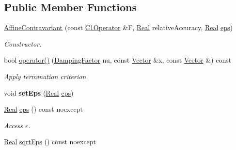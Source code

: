 \subsection*{\-Public \-Member \-Functions}
\begin{DoxyCompactItemize}
\item 
\hypertarget{classSpacy_1_1Newton_1_1Termination_1_1AffineContravariant_a84217ee3e52e0bc40ad2e1ecc13abf9a}{\hyperlink{classSpacy_1_1Newton_1_1Termination_1_1AffineContravariant_a84217ee3e52e0bc40ad2e1ecc13abf9a}{\-Affine\-Contravariant} (const \hyperlink{classSpacy_1_1C1Operator}{\-C1\-Operator} \&\-F, \hyperlink{classSpacy_1_1Real}{\-Real} relative\-Accuracy, \hyperlink{classSpacy_1_1Real}{\-Real} \hyperlink{classSpacy_1_1Mixin_1_1Eps_a812b99b0abc1d78a34b4114907f23f52}{eps})}\label{classSpacy_1_1Newton_1_1Termination_1_1AffineContravariant_a84217ee3e52e0bc40ad2e1ecc13abf9a}

\begin{DoxyCompactList}\small\item\em \-Constructor. \end{DoxyCompactList}\item 
bool \hyperlink{classSpacy_1_1Newton_1_1Termination_1_1AffineContravariant_a16b9829fd882e948b5d273b80c549f4b}{operator()} (\hyperlink{classSpacy_1_1DampingFactor}{\-Damping\-Factor} nu, const \hyperlink{classSpacy_1_1Vector}{\-Vector} \&x, const \hyperlink{classSpacy_1_1Vector}{\-Vector} \&) const 
\begin{DoxyCompactList}\small\item\em \-Apply termination criterion. \end{DoxyCompactList}\item 
\hypertarget{classSpacy_1_1Mixin_1_1Eps_a6b4c38a60848c0ab665fb3a81e181786}{void {\bfseries set\-Eps} (\hyperlink{classSpacy_1_1Real}{\-Real} \hyperlink{classSpacy_1_1Mixin_1_1Eps_a812b99b0abc1d78a34b4114907f23f52}{eps})}\label{classSpacy_1_1Mixin_1_1Eps_a6b4c38a60848c0ab665fb3a81e181786}

\item 
\hypertarget{classSpacy_1_1Mixin_1_1Eps_a812b99b0abc1d78a34b4114907f23f52}{\hyperlink{classSpacy_1_1Real}{\-Real} \hyperlink{classSpacy_1_1Mixin_1_1Eps_a812b99b0abc1d78a34b4114907f23f52}{eps} () const noexcept}\label{classSpacy_1_1Mixin_1_1Eps_a812b99b0abc1d78a34b4114907f23f52}

\begin{DoxyCompactList}\small\item\em \-Access $\varepsilon$. \end{DoxyCompactList}\item 
\hypertarget{classSpacy_1_1Mixin_1_1Eps_abd50a47b32614a950189855775a09d05}{\hyperlink{classSpacy_1_1Real}{\-Real} \hyperlink{classSpacy_1_1Mixin_1_1Eps_abd50a47b32614a950189855775a09d05}{sqrt\-Eps} () const noexcept}\label{classSpacy_1_1Mixin_1_1Eps_abd50a47b32614a950189855775a09d05}


\end{DoxyCompactItemize}
